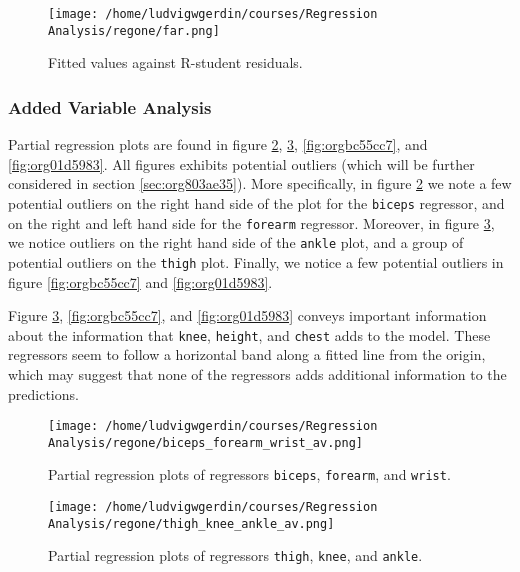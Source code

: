 \documentclass[11pt]{article}
\begin{document}
\begin{figure}[htbp]
\centering
\texttt{[image: /home/ludvigwgerdin/courses/Regression Analysis/regone/far.png]}
\caption{\label{fig:org197cb2f}
Fitted values against R-student residuals.}
\end{figure}

\subsubsection{Added Variable Analysis}
\label{sec:org1a8b559}

Partial regression plots are found in figure \ref{fig:org6810bd4}, \ref{fig:orgacf9412},
\ref{fig:orgbc55cc7}, and \ref{fig:org01d5983}. All figures exhibits potential outliers 
(which will be further considered in section \ref{sec:org803ae35}).
More specifically, in figure \ref{fig:org6810bd4} we note a 
few potential outliers on the right hand side of the plot for the \texttt{biceps} regressor, and on the
right and left hand side for the \texttt{forearm} regressor. Moreover, in figure \ref{fig:orgacf9412}, we 
notice outliers on the right hand side of the \texttt{ankle} plot, and a group of potential outliers on the
\texttt{thigh} plot. Finally, we notice a few potential outliers in figure \ref{fig:orgbc55cc7} and 
\ref{fig:org01d5983}.

Figure \ref{fig:orgacf9412}, \ref{fig:orgbc55cc7}, and \ref{fig:org01d5983} 
conveys important information about the information that \texttt{knee}, \texttt{height}, and
\texttt{chest} adds to the model. These regressors seem to follow a horizontal band along a fitted 
line from the origin, which may suggest that none of the regressors adds additional information 
to the predictions.

\begin{figure}[htbp]
\centering
\texttt{[image: /home/ludvigwgerdin/courses/Regression Analysis/regone/biceps\_forearm\_wrist\_av.png]}
\caption{\label{fig:org6810bd4}
Partial regression plots of regressors \texttt{biceps}, \texttt{forearm}, and \texttt{wrist}.}
\end{figure}   

\begin{figure}[htbp]
\centering
\texttt{[image: /home/ludvigwgerdin/courses/Regression Analysis/regone/thigh\_knee\_ankle\_av.png]}
\caption{\label{fig:orgacf9412}
Partial regression plots of regressors \texttt{thigh}, \texttt{knee}, and \texttt{ankle}.}
\end{figure}
\end{document}
